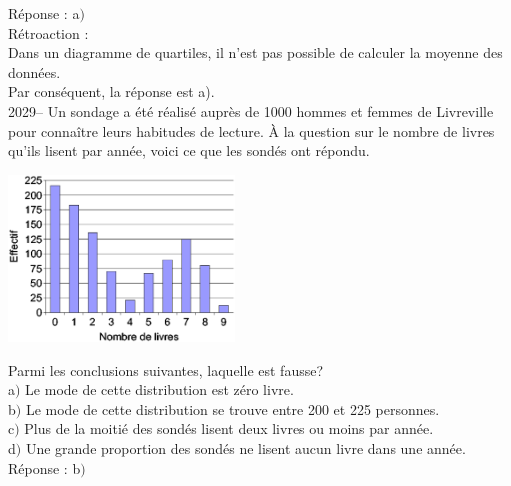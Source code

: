 \documentclass[letterpaper, 12pt]{article}
\begin{document}
R\'eponse : a$)$\\

R\'etroaction :\\
Dans un diagramme de quartiles, il n'est pas possible de calculer la moyenne des donn\'ees.\\
Par cons\'equent, la r\'eponse est a).\\

2029-- Un sondage a \'et\'e r\'ealis\'e aupr\`es de 1000 hommes et femmes de Livreville pour conna\^itre leurs habitudes de lecture. \`A la question sur le nombre de livres qu'ils lisent par ann\'ee, voici ce que les sond\'es ont r\'epondu.
\begin{center}
 \includegraphics[width=6cm]{GraphLivreEPS.eps}
\end{center}

Parmi les conclusions suivantes, laquelle est fausse?\\

a$)$ Le mode de cette distribution est z\'ero livre.\\
b$)$ Le mode de cette distribution se trouve entre 200 et 225 personnes.\\
c$)$ Plus de la moiti\'e des sond\'es lisent deux livres ou moins par ann\'ee.\\
d$)$ Une grande proportion des sond\'es ne lisent aucun livre dans une ann\'ee.\\

R\'eponse : b$)$\\
\end{document}
